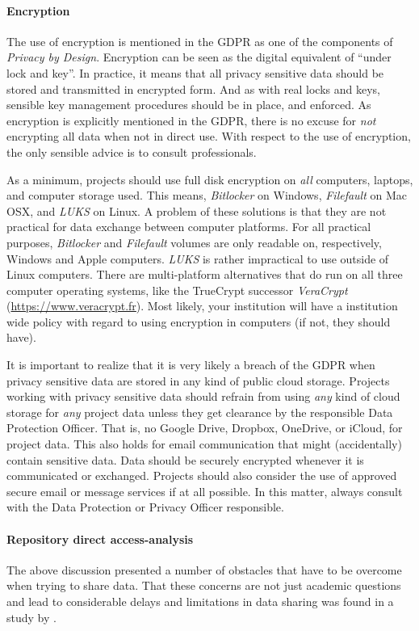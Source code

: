 \documentclass[10pt, a4paper]{article}
\begin{document}
\paragraph{Encryption} The use of encryption is mentioned in the GDPR as one of the components of \emph{Privacy by Design}. Encryption can be seen as the digital equivalent of ``under lock and key''. In practice, it means that all privacy sensitive data should be stored and transmitted in encrypted form. And as with real locks and keys, sensible key management procedures should be in place, and enforced. As encryption is explicitly mentioned in the GDPR, there is no excuse for \emph{not} encrypting all data when not in direct use. With respect to the use of encryption, the only sensible advice is to consult professionals. 

As a minimum, projects should use full disk encryption on \emph{all} computers, laptops, and computer storage used. This means, \emph{Bitlocker} on Windows, \emph{Filefault} on Mac OSX, and \emph{LUKS} on Linux. A problem of these solutions is that they are not practical for data exchange between computer platforms. For all practical purposes, \emph{Bitlocker} and \emph{Filefault} volumes are only readable on, respectively, Windows and Apple computers. \emph{LUKS} is rather impractical to use outside of Linux computers. There are multi-platform alternatives that do run on all three computer operating systems, like the TrueCrypt successor \emph{VeraCrypt} (\url{https://www.veracrypt.fr}). Most likely, your institution will have a institution wide policy with regard to using encryption in computers (if not, they should have).

It is important to realize that it is very likely a breach of the GDPR when privacy sensitive data are stored in any kind of public cloud storage. Projects working with privacy sensitive data should refrain from using \emph{any} kind of cloud storage for \emph{any} project data unless they get clearance by the responsible Data Protection Officer. That is, no Google Drive, Dropbox, OneDrive, or iCloud, for project data. This also holds for email communication that might (accidentally) contain sensitive data. Data should be securely encrypted whenever it is communicated or exchanged. Projects should also consider the use of approved secure email or message services if at all possible. In this matter, always consult with the Data Protection or Privacy Officer responsible.

\paragraph{Repository direct access-analysis} The above discussion presented a number of obstacles that have to be overcome when trying to share data. That these concerns are not just academic questions and lead to considerable delays and limitations in data sharing was found in a study by \cite{SIMELL201998}. 
\end{document}
